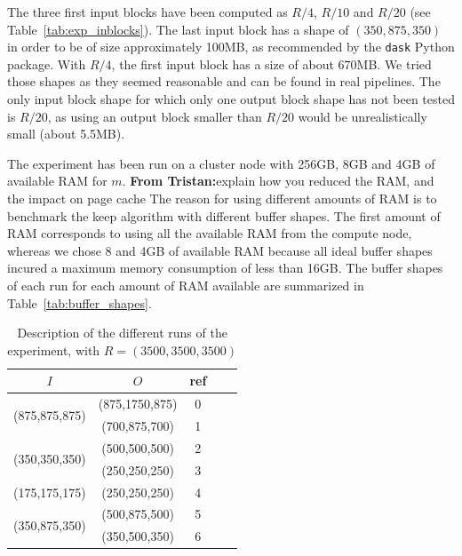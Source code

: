 \documentclass[sigconf, nonacm]{acmart}
\newcommand{\tristan}[1]{\color{orange}\textbf{From Tristan:}#1\color{black}}
\begin{document}
The three first input blocks have been computed as $R/4$, $R/10$ and $R/20$
(see Table~\ref{tab:exp_inblocks}).
The last input block has a shape of $(350,875,350)$ in order to be of size
approximately 100MB, as recommended by the \texttt{dask} Python package.
With $R/4$, the first input block has a size of about 670MB.
We tried those shapes as they seemed reasonable and can be found in real pipelines.
The only input block shape for which only one output block shape has not been tested
is $R/20$, as using an output block smaller than $R/20$ would be unrealistically
small (about 5.5MB).

The experiment has been run on a cluster node with 256GB, 8GB and 4GB of
available RAM for $m$. \tristan{explain how you reduced the RAM, and the impact on page cache}
The reason for using different amounts of RAM is to benchmark the keep algorithm
with different buffer shapes.
The first amount of RAM corresponds to using all the
available RAM from the compute node, whereas we chose 8 and 4GB of available RAM
because all ideal buffer shapes incured a maximum memory consumption of less than
16GB.
The buffer shapes of each run for each amount of RAM available are summarized in
Table~\ref{tab:buffer_shapes}.

\begin{table}[ht]
  \centering
  \caption{Description of the different runs of the experiment, with $R=(3500,3500,3500)$}

   \begin{tabular}[t]{| c | c | c | c | c |}
   \hline
   $I$ & $O$ & ref \\
   \hline
   \multirow{2}{*}{(875,875,875)} & (875,1750,875) & 0 \\
   & (700,875,700) & 1 \\
   \hline
   \multirow{2}{*}{(350,350,350)} & (500,500,500) & 2 \\
   & (250,250,250) & 3 \\
   \hline
   \multirow{1}{*}{(175,175,175)} & (250,250,250) & 4 \\
   \hline
   \multirow{2}{*}{(350,875,350)} & (500,875,500) & 5 \\
   & (350,500,350) & 6 \\
   \hline
   \end{tabular}

   \label{tab:exp}

\end{table}
\end{document}

